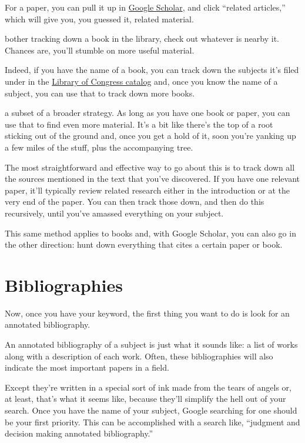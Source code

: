 For a paper, you can pull it up in \href{http://scholar.google.com/}{Google Scholar}, and click ``related
articles,'' which will give you, you guessed it, related material.

 bother tracking down a book in the library, check out whatever
is nearby it. Chances are, you'll stumble on more useful material.

Indeed, if you have the name of a book, you can track down the subjects it's filed under in the
\href{http://catalog.loc.gov/}{Library of Congress catalog} and, once you know the name of a subject, you can use that
to track down more books.

 a subset of a broader strategy. As long as you have one
book or paper, you can use that to find even more material. It's a bit like
there's the top of a root sticking out of the ground and, once you get a hold of
it, soon you're yanking up a few miles of the stuff, plus the accompanying tree.

The most straightforward and effective way to go about this is to track down all the sources mentioned in the text that you've discovered. If you have one
relevant paper, it'll typically review related research either in the
introduction or at the very end of the paper. You can then track those down, and
then do this recursively, until you've amassed everything on your
subject.

This same method applies to books and, with Google Scholar, you can also go in
the other direction: hunt down everything that cites a certain paper or book.

\section{Bibliographies}

Now, once you have your keyword, the first thing you want to do is look for an
annotated bibliography.

An annotated bibliography of a subject is just what it sounds like: a list of
works along with a description of each work. Often, these bibliographies will
also indicate the most important papers in a field.

Except they're written in a special sort of ink made from the tears of angels
or, at least, that's what it seems like, because they'll simplify the hell out
of your search.  Once you have the
name of your subject, Google searching for one should be your first
priority. This can be accomplished with a search like, ``judgment and decision
making annotated bibliography.''


